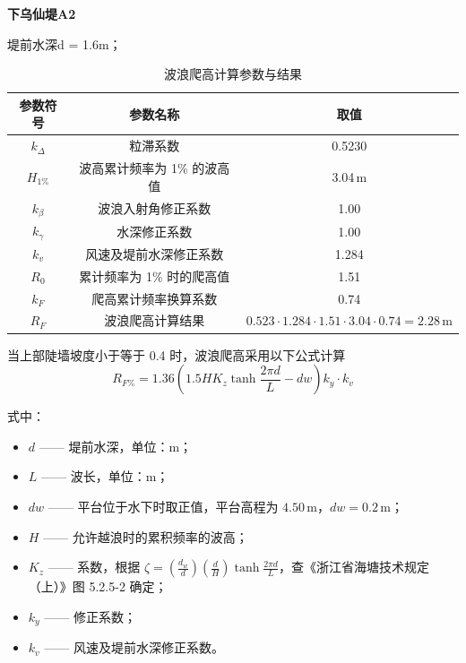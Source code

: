 \documentclass[UTF8, a4paper, 12pt]{ctexart} %
\begin{document}
\par
\textbf{下乌仙堤A2}
\par
堤前水深d = 1.6m；
\par
\begin{table}[h]
    \centering
    \caption{波浪爬高计算参数与结果}
    \begin{tabular}{|c|c|c|}
        \hline
        参数符号 & 参数名称 & 取值 \\ \hline
        $k_\Delta$ & 粒滞系数 & 0.5230 \\ \hline
        $H_{1\%}$ & 波高累计频率为 1\% 的波高值 & 3.04\,m \\ \hline
        $k_\beta$ & 波浪入射角修正系数 & 1.00 \\ \hline
        $k_\gamma$ & 水深修正系数 & 1.00 \\ \hline
        $k_v$ & 风速及堤前水深修正系数 & 1.284 \\ \hline
        $R_0$ & 累计频率为 1\% 时的爬高值 & 1.51 \\ \hline
        $k_F$ & 爬高累计频率换算系数 & 0.74 \\ \hline
        $R_F$ & 波浪爬高计算结果 & $0.523 \cdot 1.284 \cdot 1.51 \cdot 3.04 \cdot 0.74 = 2.28\,\text{m}$ \\ \hline
    \end{tabular}
    \label{tab:wave_runup_calculation}
\end{table}

\par

当上部陡墙坡度小于等于 0.4 时，波浪爬高采用以下公式计算
\begin{equation}
    R_{F\%} = 1.36 \left( 1.5 H K_z \tanh \frac{2 \pi d}{L} - dw \right) k_y \cdot k_v
\end{equation}

式中：
\begin{itemize}
    \item $d$ —— 堤前水深，单位：$\text{m}$；
    \item $L$ —— 波长，单位：$\text{m}$；
    \item $dw$ —— 平台位于水下时取正值，平台高程为 $4.50\,\text{m}$，$dw = 0.2\,\text{m}$；
    \item $H$ —— 允许越浪时的累积频率的波高；
    \item $K_z$ —— 系数，根据 $\zeta = \left( \frac{d_w}{d} \right) \left( \frac{d}{H} \right) \tanh \frac{2 \pi d}{L}$，查《浙江省海塘技术规定（上）》图 5.2.5-2 确定；
    \item $k_y$ —— 修正系数；
    \item $k_v$ —— 风速及堤前水深修正系数。
\end{itemize}
\end{document}
